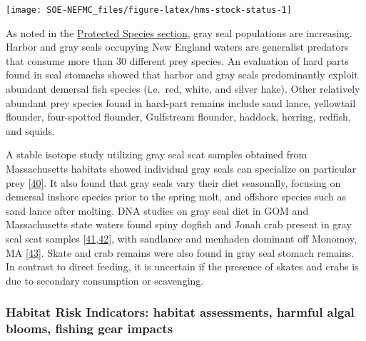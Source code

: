 \documentclass[
  10pt,
]{article}
\let\origfigure\figure
\let\endorigfigure\endfigure
\renewenvironment{figure}[1][2] {
    \expandafter\origfigure\expandafter[H]
} {
    \endorigfigure
}
\begin{document}
\begin{figure}

{\centering \texttt{[image: SOE-NEFMC\_files/figure-latex/hms-stock-status-1]} 

}

\caption{Summary of single species status for HMS stocks; key to species names at https://noaa-edab.github.io/tech-doc/atlantic-highly-migratory-species-stock-status.html.}\label{fig:hms-stock-status}
\end{figure}

As noted in the \protect\hyperlink{protected-species}{Protected Species section}, gray seal populations are increasing. Harbor and gray seals occupying New England waters are generalist predators that consume more than 30 different prey species. An evaluation of hard parts found in seal stomachs showed that harbor and gray seals predominantly exploit abundant demersal fish species (i.e.~red, white, and silver hake). Other relatively abundant prey species found in hard-part remains include sand lance, yellowtail flounder, four-spotted flounder, Gulfstream flounder, haddock, herring, redfish, and squids.

A stable isotope study utilizing gray seal scat samples obtained from Massachusetts habitats showed individual gray seals can specialize on particular prey {[}\protect\hyperlink{ref-hernandez_seasonal_2019}{40}{]}. It also found that gray seals vary their diet seasonally, focusing on demersal inshore species prior to the spring molt, and offshore species such as sand lance after molting. DNA studies on gray seal diet in GOM and Massachusetts state waters found spiny dogfish and Jonah crab present in gray seal scat samples {[}\protect\hyperlink{ref-ono_detecting_2019}{41},\protect\hyperlink{ref-mccosker_metabarcoding_2020}{42}{]}, with sandlance and menhaden dominant off Monomoy, MA {[}\protect\hyperlink{ref-flanders_utilizing_2020}{43}{]}. Skate and crab remains were also found in gray seal stomach remains. In contrast to direct feeding, it is uncertain if the presence of skates and crabs is due to secondary consumption or scavenging.

\hypertarget{habitat-risk-indicators-habitat-assessments-harmful-algal-blooms-fishing-gear-impacts}{%
\subsubsection{Habitat Risk Indicators: habitat assessments, harmful algal blooms, fishing gear impacts}\label{habitat-risk-indicators-habitat-assessments-harmful-algal-blooms-fishing-gear-impacts}}
\end{document}
